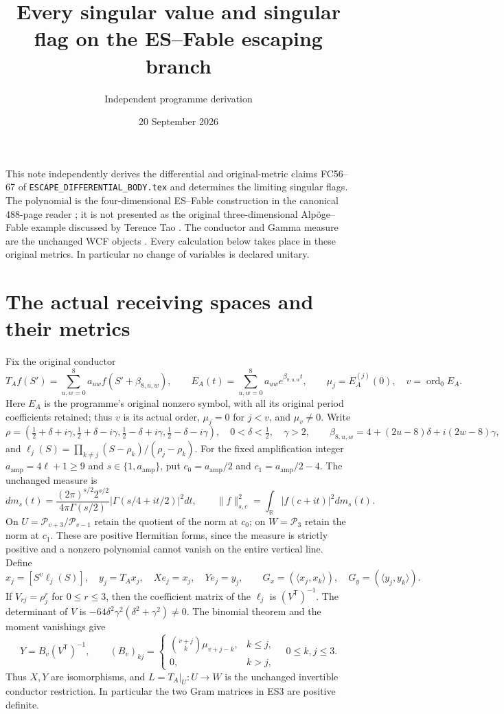 \documentclass[11pt]{article}
\title{Every singular value and singular flag on the ES--Fable escaping branch}
\author{Independent programme derivation}
\date{20 September 2026}
\newcommand{\cP}{\mathcal P}
\begin{document}
\maketitle
This note independently derives the differential and original-metric
claims FC56--67 of \texttt{ESCAPE\_DIFFERENTIAL\_BODY.tex} and determines
the limiting singular flags. The polynomial is the four-dimensional
ES--Fable construction in the canonical 488-page reader \cite{ES}; it
is not presented as the original three-dimensional Alp\"oge--Fable
example discussed by Terence Tao \cite{Tao}. The conductor and Gamma
measure are the unchanged WCF objects \cite{WCF}. Every calculation
below takes place in these original metrics. In particular no change
of variables is declared unitary.

\section{The actual receiving spaces and their metrics}
Fix the original conductor
\[
 T_A f(S')=\sum_{u,w=0}^8 a_{uw}f(S'+\beta_{8,u,w}),\qquad
 E_A(t)=\sum_{u,w=0}^8a_{uw}e^{\beta_{8,u,w}t},\qquad
 \mu_j=E_A^{(j)}(0),\quad v=\operatorname{ord}_0E_A.
 \tag{ES1}
\]
Here $E_A$ is the programme's original nonzero symbol, with all its
original period coefficients retained; thus $v$ is its actual order,
$\mu_j=0$ for $j<v$, and $\mu_v\ne0$. Write
\[
 \rho=(\tfrac12+\delta+i\gamma,\tfrac12+\delta-i\gamma,
        \tfrac12-\delta+i\gamma,\tfrac12-\delta-i\gamma),
 \quad 0<\delta<\tfrac12,\quad\gamma>2,
 \qquad \beta_{8,u,w}=4+(2u-8)\delta+i(2w-8)\gamma,
\]
and $\ell_j(S)=\prod_{k\ne j}(S-\rho_k)/(\rho_j-\rho_k)$.
For the fixed amplification integer $a_{\mathrm{amp}}=4\ell+1\ge9$
and $s\in\{1,a_{\mathrm{amp}}\}$, put $c_0=a_{\mathrm{amp}}/2$
and $c_1=a_{\mathrm{amp}}/2-4$. The unchanged measure is
\[
 dm_s(t)=\frac{(2\pi)^{s/2}2^{s/2}}{4\pi\Gamma(s/2)}
 |\Gamma(s/4+it/2)|^2dt,\qquad
 \|f\|_{s,c}^2=\int_{\mathbb R}|f(c+it)|^2dm_s(t).
 \tag{ES2}
\]
On $U=\cP_{v+3}/\cP_{v-1}$ retain the quotient of the norm at
$c_0$; on $W=\cP_3$ retain the norm at $c_1$. These are positive
Hermitian forms, since the measure is strictly positive and a
nonzero polynomial cannot vanish on the entire vertical line.
Define
\[
 x_j=[S^v\ell_j(S)],\quad y_j=T_Ax_j,\quad Xe_j=x_j,\quad Ye_j=y_j,
 \qquad G_x=(\langle x_j,x_k\rangle),\quad G_y=(\langle y_j,y_k\rangle).
 \tag{ES3}
\]
If $V_{rj}=\rho_j^r$ for $0\le r\le3$, then the coefficient
matrix of the $\ell_j$ is $(V^{\mathsf T})^{-1}$. The determinant
of $V$ is $-64\delta^2\gamma^2(\delta^2+\gamma^2)\ne0$.
The binomial theorem and the moment vanishings give
\[
 Y=B_v(V^{\mathsf T})^{-1},\qquad
 (B_v)_{kj}=\begin{cases}\binom{v+j}{k}\mu_{v+j-k},&k\le j,\\0,&k>j,
 \end{cases}\quad 0\le k,j\le3.
 \tag{ES4}
\]
Thus $X,Y$ are isomorphisms, and $L=T_A|_U:U\to W$ is the
unchanged invertible conductor restriction. In particular the two
Gram matrices in ES3 are positive definite.
\end{document}
